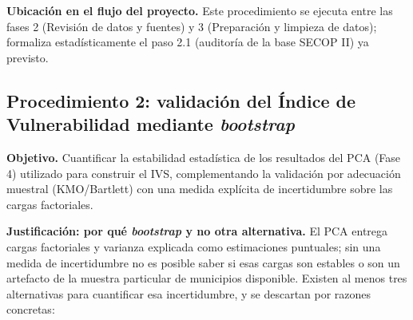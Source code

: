 \documentclass[11pt,letterpaper]{article}
\begin{document}
\textbf{Ubicación en el flujo del proyecto.} Este procedimiento se ejecuta
entre las fases 2 (Revisión de datos y fuentes) y 3 (Preparación y limpieza de
datos); formaliza estadísticamente el paso 2.1 (auditoría de la base SECOP II)
ya previsto.

\subsection{Procedimiento 2: validación del Índice de Vulnerabilidad mediante \textit{bootstrap}}

\textbf{Objetivo.} Cuantificar la estabilidad estadística de los resultados
del PCA (Fase 4) utilizado para construir el IVS, complementando la validación
por adecuación muestral (KMO/Bartlett) con una medida explícita de
incertidumbre sobre las cargas factoriales.

\textbf{Justificación: por qué \textit{bootstrap} y no otra alternativa.} El
PCA entrega cargas factoriales y varianza explicada como estimaciones
puntuales; sin una medida de incertidumbre no es posible saber si esas cargas
son estables o son un artefacto de la muestra particular de municipios
disponible. Existen al menos tres alternativas para cuantificar esa
incertidumbre, y se descartan por razones concretas:
\end{document}
